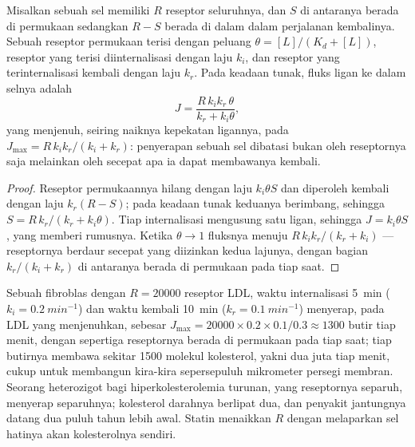\begin{proposition}\label{prop:b3:membrane-traffic:uptake}
Misalkan sebuah sel memiliki $R$ reseptor seluruhnya, dan $S$ di antaranya
berada di permukaan sedangkan $R - S$ berada di dalam dalam perjalanan
kembalinya. Sebuah reseptor permukaan terisi dengan peluang
$\theta = [L]/(K_{d} + [L])$, reseptor yang terisi diinternalisasi dengan laju
$k_{i}$, dan reseptor yang terinternalisasi kembali dengan laju $k_{r}$. Pada
keadaan tunak, fluks ligan ke dalam selnya adalah
\[
J = \frac{R\,k_{i}k_{r}\,\theta}{k_{r} + k_{i}\theta},
\]
yang menjenuh, seiring naiknya kepekatan ligannya, pada $J_{\max} =
R\,k_{i}k_{r}/(k_{i} + k_{r})$: penyerapan sebuah sel dibatasi bukan oleh
reseptornya saja melainkan oleh secepat apa ia dapat membawanya kembali.
\end{proposition}
\begin{proof}
Reseptor permukaannya hilang dengan laju $k_{i}\theta S$ dan diperoleh kembali
dengan laju $k_{r}(R - S)$; pada keadaan tunak keduanya berimbang, sehingga
$S = R\,k_{r}/(k_{r}
+ k_{i}\theta)$. Tiap internalisasi mengusung satu ligan, sehingga $J =
k_{i}\theta S$, yang memberi rumusnya. Ketika $\theta \to 1$ fluksnya
menuju $R\,k_{i}k_{r}/(k_{r} + k_{i})$ --- reseptornya berdaur secepat yang
diizinkan kedua lajunya, dengan bagian $k_{r}/(k_{i} + k_{r})$ di antaranya
berada di permukaan pada tiap saat.
\end{proof}

\begin{example}\label{ex:b3:membrane-traffic:ldl}
Sebuah fibroblas dengan $R = \num{20000}$ reseptor LDL, waktu internalisasi
\qty{5}{min} ($k_{i} = \qty{0.2}{min^{-1}}$) dan waktu kembali
\qty{10}{min} ($k_{r} = \qty{0.1}{min^{-1}}$) menyerap, pada LDL yang
menjenuhkan, sebesar $J_{\max} = \num{20000}\times 0.2\times 0.1/0.3 \approx 1300$
butir tiap menit, dengan sepertiga reseptornya berada di permukaan pada tiap
saat; tiap butirnya membawa sekitar \num{1500} molekul
kolesterol, yakni dua juta tiap menit, cukup untuk membangun kira-kira
sepersepuluh mikrometer persegi membran. Seorang heterozigot bagi
hiperkolesterolemia turunan, yang reseptornya separuh, menyerap separuhnya;
kolesterol darahnya berlipat dua, dan penyakit jantungnya datang dua puluh
tahun lebih awal. Statin menaikkan $R$ dengan melaparkan sel hatinya akan
kolesterolnya sendiri.
\end{example}

